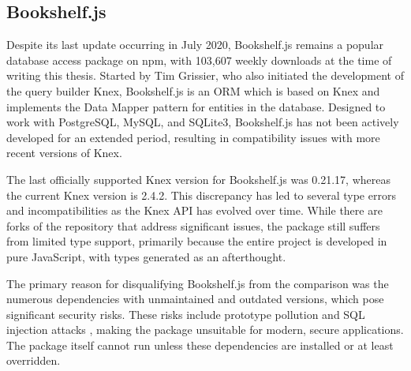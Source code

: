 \subsection{Bookshelf.js}

Despite its last update occurring in July 2020, Bookshelf.js remains a popular
database access package on npm, with 103,607 weekly downloads at the time of
writing this thesis. Started by Tim Grissier, who also initiated the development
of the query builder Knex, Bookshelf.js is an ORM which is based on Knex and
implements the Data Mapper pattern for entities in the database. Designed to
work with PostgreSQL, MySQL, and SQLite3, Bookshelf.js has not been actively
developed for an extended period, resulting in compatibility issues with more
recent versions of Knex.

The last officially supported Knex version for Bookshelf.js was 0.21.17, whereas
the current Knex version is 2.4.2. This discrepancy has led to several type
errors and incompatibilities as the Knex API has evolved over time. While there
are forks of the repository that address significant issues, the package still
suffers from limited type support, primarily because the entire project is
developed in pure JavaScript, with types generated as an afterthought.

The primary reason for disqualifying Bookshelf.js from the comparison was the
numerous dependencies with unmaintained and outdated versions, which pose
significant security risks. These risks include prototype pollution
\cite{cve-2019-10744} and SQL injection attacks \cite{cve-2016-20018}, making
the package unsuitable for modern, secure applications. The package itself
cannot run unless these dependencies are installed or at least overridden.
